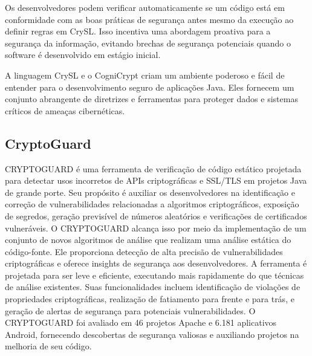 Os desenvolvedores podem verificar automaticamente se um código está em conformidade com as boas práticas de segurança antes mesmo da execução ao definir regras em CrySL. Isso incentiva uma abordagem proativa para a segurança da informação, evitando brechas de segurança potenciais quando o software é desenvolvido em estágio inicial.

A linguagem CrySL e o CogniCrypt criam um ambiente poderoso e fácil de entender para o desenvolvimento seguro de aplicações Java. Eles fornecem um conjunto abrangente de diretrizes e ferramentas para proteger dados e sistemas críticos de ameaças cibernéticas.

\subsection{CryptoGuard} %

CRYPTOGUARD é uma ferramenta de verificação de código estático projetada para detectar usos incorretos de APIs criptográficas e SSL/TLS em projetos Java de grande porte. Seu propósito é auxiliar os desenvolvedores na identificação e correção de vulnerabilidades relacionadas a algoritmos criptográficos, exposição de segredos, geração previsível de números aleatórios e verificações de certificados vulneráveis. O CRYPTOGUARD alcança isso por meio da implementação de um conjunto de novos algoritmos de análise que realizam uma análise estática do código-fonte. Ele proporciona detecção de alta precisão de vulnerabilidades criptográficas e oferece insights de segurança aos desenvolvedores. A ferramenta é projetada para ser leve e eficiente, executando mais rapidamente do que técnicas de análise existentes. Suas funcionalidades incluem identificação de violações de propriedades criptográficas, realização de fatiamento para frente e para trás, e geração de alertas de segurança para potenciais vulnerabilidades. O CRYPTOGUARD foi avaliado em 46 projetos Apache e 6.181 aplicativos Android, fornecendo descobertas de segurança valiosas e auxiliando projetos na melhoria de seu código.



